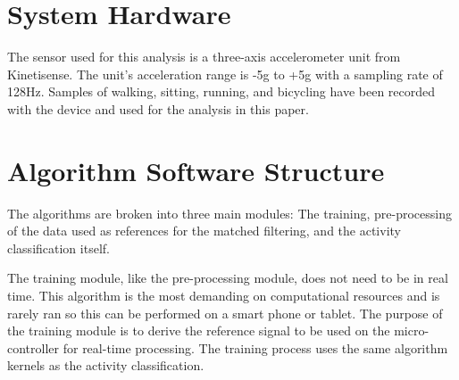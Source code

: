 \documentclass[journal]{IEEEtran}
\begin{document}
\section{System Hardware}
The sensor used for this analysis is a three-axis accelerometer unit from Kinetisense.
The unit’s acceleration range is -5g to +5g with a sampling rate of 128Hz.
Samples of walking, sitting, running, and bicycling have been recorded with the device and used for the analysis in this paper.
%
\section{Algorithm Software Structure}
%
The algorithms are broken into three main modules: The training, pre-processing of the data used as references for the matched filtering, and the activity classification itself.

The training module, like the pre-processing module, does not need to be in real time.
This algorithm is the most demanding on computational resources and is rarely ran so this can be performed on a smart phone or tablet.
The purpose of the training module is to derive the reference signal to be used on the micro-controller for real-time processing.
The training process uses the same algorithm kernels as the activity classification.
%
\end{document}
